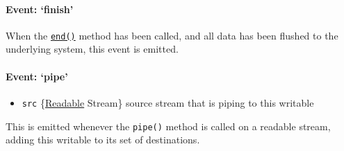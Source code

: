 \paragraph{Event: `finish'}

When the
\hyperref[stream\_writable\_end\_chunk\_encoding\_callback]{\texttt{end()}}
method has been called, and all data has been flushed to the underlying
system, this event is emitted.

\begin{Shaded}
\begin{Highlighting}[]
 
 \NormalTok{(} 
  \NormalTok{(} \NormalTok{);}
\NormalTok{\}}
\NormalTok{(}\NormalTok{);}
\NormalTok{(}\NormalTok{, }\NormalTok{() \{}
  \NormalTok{(}\NormalTok{);}
\NormalTok{\});}
\end{Highlighting}
\end{Shaded}

\paragraph{Event: `pipe'}

\begin{itemize}
\item
  \texttt{src} \{\hyperref[stream\_class\_stream\_readable]{Readable}
  Stream\} source stream that is piping to this writable
\end{itemize}

This is emitted whenever the \texttt{pipe()} method is called on a
readable stream, adding this writable to its set of destinations.

\begin{Shaded}
\begin{Highlighting}[]
 
 
\NormalTok{(}\NormalTok{, }
  \NormalTok{(}\NormalTok{);}
\NormalTok{\});}
\end{Highlighting}
\end{Shaded}

